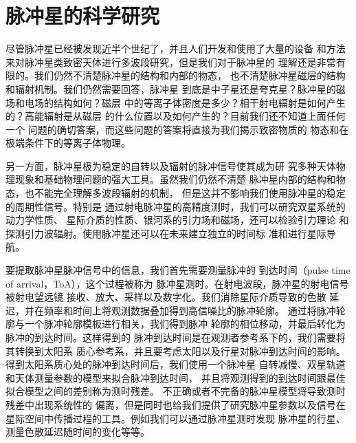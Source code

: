 \section{脉冲星的科学研究}

尽管脉冲星已经被发现近半个世纪了，并且人们开发和使用了大量的设备
和方法来对脉冲星类致密天体进行多波段研究，但是我们对于脉冲星的
理解还是非常有限的。我们仍然不清楚脉冲星的结构和内部的物态，
也不清楚脉冲星磁层的结构和辐射机制。我们仍然需要回答，脉冲星
到底是中子星还是夸克星？脉冲星的磁场和电场的结构如何？磁层
中的等离子体密度是多少？相干射电辐射是如何产生的？高能辐射是从磁层
的什么位置以及如何产生的？目前我们还不知道上面任何一个
问题的确切答案，而这些问题的答案将直接为我们揭示致密物质的
物态和在极端条件下的等离子体物理。

另一方面，脉冲星极为稳定的自转以及辐射的脉冲信号使其成为研
究多种天体物理现象和基础物理问题的强大工具。虽然我们仍然不清楚
脉冲星内部的结构和物态，也不能完全理解多波段辐射的机制，
但是这并不影响我们使用脉冲星的稳定的周期性信号。特别是
通过射电脉冲星的高精度测时，我们可以研究双星系统的动力学性质、
星际介质的性质、银河系的引力场和磁场，还可以检验引力理论
和探测引力波辐射。使用脉冲星还可以在未来建立独立的时间标
准和进行星际导航。

要提取脉冲星脉冲信号中的信息，我们首先需要测量脉冲的
到达时间（pulse time of arrival，ToA），这个过程被称为
脉冲星测时。在射电波段，脉冲星的射电信号被射电望远镜
接收、放大、采样以及数字化。我们消除星际介质导致的色散
延迟，并在频率和时间上将观测数据叠加得到高信噪比的脉冲轮廓。
通过将脉冲轮廓与一个脉冲轮廓模板进行相关，我们得到脉冲
轮廓的相位移动，并最后转化为脉冲的到达时间。这样得到的
脉冲到达时间是在观测者参考系下的，我们需要将其转换到太阳系
质心参考系，并且要考虑太阳以及行星对脉冲到达时间的影响。
得到太阳系质心处的脉冲到达时间后，我们使用一个脉冲星
自转减慢、双星轨道和天体测量参数的模型来拟合脉冲到达时间，
并且将观测得到的到达时间跟最佳拟合模型之间的差别称为测时残差。
不正确或者不完备的脉冲星模型将导致测时残差中出现系统性的
偏离，但是同时也给我们提供了研究脉冲星参数以及信号在
星际空间中传播过程的工具。例如我们可以通过脉冲星测时发现
脉冲星的行星、测量色散延迟随时间的变化等等。

